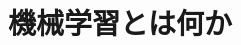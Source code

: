 \documentclass[../../topic_machine-learning]{subfiles}
\begin{document}
\chapter{機械学習とは何か}




\end{document}
